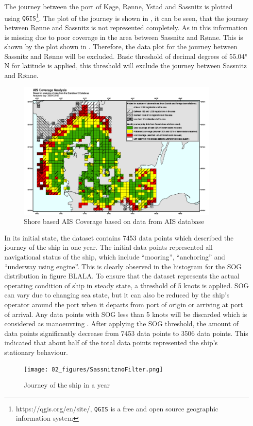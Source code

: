 The journey between the port of K{\o}ge, R{\o}nne, Ystad and Sassnitz is plotted using {\tt QGIS}\footnote{https://qgis.org/en/site/, {\tt QGIS} is a free and open source geographic information system}. The plot of the journey is shown in , it can be seen, that the journey between R{\o}nne and Sassnitz is not represented completely. As in this information is missing due to poor coverage in the area between Sassnitz and R{\o}nne. This is shown by the plot shown in . Therefore, the data plot for the journey between Sassnitz and R{\o}nne will be excluded. Basic threshold of decimal degrees of 55.04° N for latitude is applied, this threshold will exclude the journey between Sassnitz and R{\o}nne.\\ 
\begin{figure}
    \centering
        \includegraphics[width=0.9\textwidth]{02_figures/AIS_Coverage.png}
        \caption{Shore based AIS Coverage based on data from AIS database \cite{webaisdk.2023}}
        \label{fig:aiscoverage}
\end{figure}

In its initial state, the dataset contains 7453 data points which described the journey of the ship in one year. The initial data points represented all navigational status of the ship, which include ``mooring'', ``anchoring'' and ``underway using engine''. This is clearly observed in the histogram for the SOG distribution in figure BLALA. To ensure that the dataset represents the actual operating condition of ship in steady state, a threshold of 5 knots is applied. SOG can vary due to changing sea state, but it can also be reduced by the ship's operator around the port when it departs from port of origin or arriving at port of arrival. Any data points with SOG less than 5 knots will be discarded which is considered as manoeuvring \cite{Abebe.2020}. After applying the SOG threshold, the amount of data points significantly decrease from 7453 data points to 3506 data points. This indicated that about half of the total data points represented the ship's stationary behaviour. \\
\begin{figure}
    \centering
        \texttt{[image: 02\_figures/SassnitznoFilter.png]}
        \caption{Journey of the ship in a year}
        \label{fig:YearJourney}
\end{figure}

